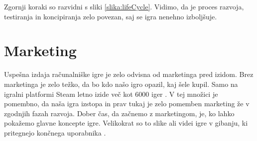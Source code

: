 \documentclass[12pt,a4paper,twoside]{book}
\begin{document}
Zgornji koraki so razvidni s sliki \ref{slika:lifeCycle}. Vidimo, da je proces razvoja, testiranja in koncipiranja zelo povezan, saj se igra nenehno izboljšuje.

\section{Marketing}
Uspešna izdaja računalniške igre je zelo odvisna od marketinga pred izidom. Brez marketinga je zelo težko, da bo kdo našo igro opazil, kaj šele kupil. Samo na igralni platformi Steam letno izide več kot 6000 iger \cite{james6000Games}. V tej množici je pomembno, da naša igra izstopa in prav tukaj je zelo pomemben marketing že v zgodnjih fazah razvoja. Dober čas, da začnemo z marketingom, je, ko lahko pokažemo glavne koncepte igre. Velikokrat so to slike ali videi igre v gibanju, ki pritegnejo končnega uporabnika \cite{robertMarketing}.
\end{document}
